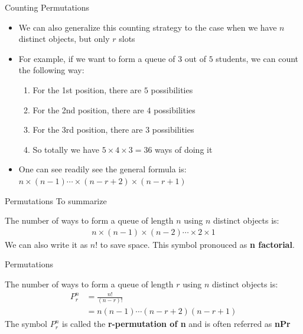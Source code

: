 \documentclass[10pt,xcolor={table,dvipsnames},t]{beamer}
\begin{document}
\begin{frame}{Counting Permutations}
  \begin{itemize}
    \item We can also generalize this counting strategy to the case when we have $n$ distinct objects, but only $r$ slots
    \item For example, if we want to form a queue of $3$ out of $5$ students, we can count the following way:
    \begin{enumerate}
      \item For the 1st position, there are $5$ possibilities
      \item For the 2nd position, there are $4$ possibilities 
      \item For the 3rd position, there are $3$ possibilities
      \item So totally we have $5\times4\times3=36$ ways of doing it
    \end{enumerate}
    \item One can see readily see the general formula is: $n\times(n-1)\cdots\times(n-r+2)\times(n-r+1)$ 
  \end{itemize}
\end{frame}

\begin{frame}{Permutations}
  To summarize
  \begin{theorem}
    The number of ways to form a queue of length $n$ using $n$ distinct objects is:
    \begin{align*}
      n\times(n-1)\times(n-2)\cdots \times 2\times 1
    \end{align*}
    We can also write it as $n!$ to save space. This symbol pronouced as \textbf{n factorial}.
  \end{theorem}
\end{frame}

\begin{frame}{Permutations}
  \begin{theorem}
    The number of ways to form a queue of length $r$ using $n$ distinct objects is:
    \begin{align*}
      P^n_r &= \frac{n!}{(n-r)!}\\ &
      = n(n-1)\cdots(n-r+2)(n-r+1)
    \end{align*}
    The symbol $P^n_r$ is called the \textbf{r-permutation of n} and is often referred as \textbf{nPr}
  \end{theorem}
\end{frame}
\end{document}

